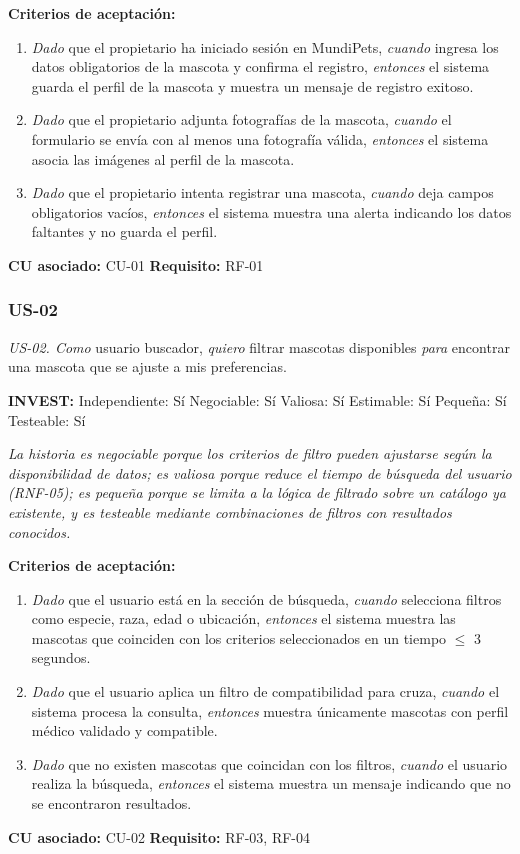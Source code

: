 \documentclass[journal,onecolumn]{IEEEtran}
\begin{document}
\textbf{Criterios de aceptación:}
\begin{enumerate}[leftmargin=*]
  \item \textit{Dado} que el propietario ha iniciado sesión en MundiPets,
  \textit{cuando} ingresa los datos obligatorios de la mascota y confirma el
  registro, \textit{entonces} el sistema guarda el perfil de la mascota y
  muestra un mensaje de registro exitoso.
  \item \textit{Dado} que el propietario adjunta fotografías de la mascota,
  \textit{cuando} el formulario se envía con al menos una fotografía válida,
  \textit{entonces} el sistema asocia las imágenes al perfil de la mascota.
  \item \textit{Dado} que el propietario intenta registrar una mascota,
  \textit{cuando} deja campos obligatorios vacíos, \textit{entonces} el
  sistema muestra una alerta indicando los datos faltantes y no guarda el
  perfil.
\end{enumerate}
\textbf{CU asociado:} CU-01 \quad \textbf{Requisito:} RF-01

\subsubsection{US-02}

\begin{mdframed}[style=guia]
\textit{US-02. Como} usuario buscador, \textit{quiero} filtrar mascotas
disponibles \textit{para} encontrar una mascota que se ajuste a mis
preferencias.
\end{mdframed}

\textbf{INVEST:} Independiente: Sí \quad Negociable: Sí \quad
Valiosa: Sí \quad Estimable: Sí \quad
Pequeña: Sí \quad Testeable: Sí

\textit{La historia es negociable porque los criterios de filtro pueden
ajustarse según la disponibilidad de datos; es valiosa porque reduce el
tiempo de búsqueda del usuario (RNF-05); es pequeña porque se limita a la
lógica de filtrado sobre un catálogo ya existente, y es testeable mediante
combinaciones de filtros con resultados conocidos.}

\textbf{Criterios de aceptación:}
\begin{enumerate}[leftmargin=*]
  \item \textit{Dado} que el usuario está en la sección de búsqueda,
  \textit{cuando} selecciona filtros como especie, raza, edad o ubicación,
  \textit{entonces} el sistema muestra las mascotas que coinciden con los
  criterios seleccionados en un tiempo $\leq$ 3 segundos.
  \item \textit{Dado} que el usuario aplica un filtro de compatibilidad para
  cruza, \textit{cuando} el sistema procesa la consulta, \textit{entonces}
  muestra únicamente mascotas con perfil médico validado y compatible.
  \item \textit{Dado} que no existen mascotas que coincidan con los
  filtros, \textit{cuando} el usuario realiza la búsqueda, \textit{entonces}
  el sistema muestra un mensaje indicando que no se encontraron resultados.
\end{enumerate}
\textbf{CU asociado:} CU-02 \quad \textbf{Requisito:} RF-03, RF-04
\end{document}

